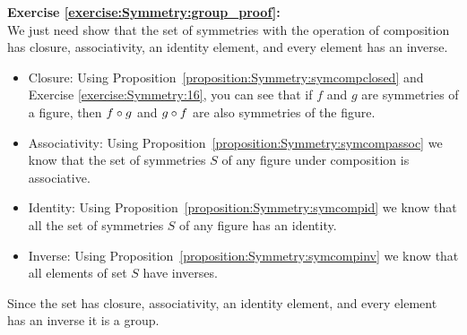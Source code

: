 \noindent\textbf{Exercise \ref{exercise:Symmetry:group_proof}:}\\ 
We just need show that the set of symmetries with the operation of composition has closure, associativity, an identity element, and every element has an inverse.  
\begin{itemize}
\item
Closure: Using Proposition~\ref{proposition:Symmetry:symcompclosed} and Exercise \ref{exercise:Symmetry:16}, you can see that if $f$ and $g$ are symmetries of a figure, then $f \circ g$ and $g \circ f$ are also symmetries of the figure.

\item
Associativity: Using Proposition~\ref{proposition:Symmetry:symcompassoc} we know that the set of symmetries $S$ of any figure under composition is associative.

\item
Identity: Using Proposition~\ref{proposition:Symmetry:symcompid} we know that all the set of symmetries $S$ of any figure has an identity.

\item
Inverse: Using Proposition~\ref{proposition:Symmetry:symcompinv} we know that all elements of set $S$ have inverses.
\end{itemize}
Since the set has closure, associativity, an identity element, and every element has an inverse it is a group.\\

